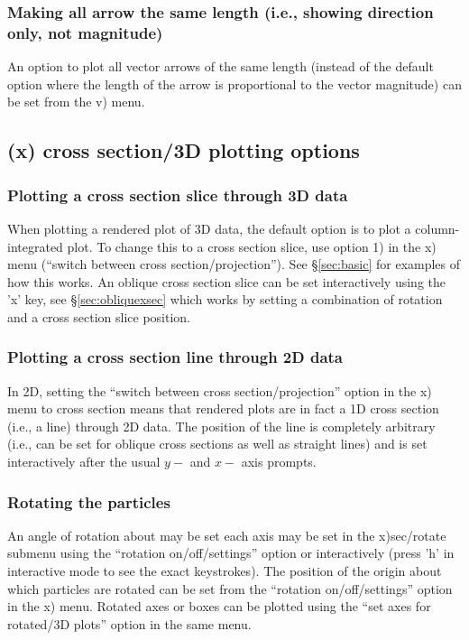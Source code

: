 \documentclass[a4paper,10pt]{article}
\begin{document}
\subsubsection{ Making all arrow the same length (i.e., showing direction only, not magnitude)}
 An option to plot all vector arrows of the same length (instead of the default option where the length of the arrow is proportional to the vector magnitude) can be set from the v) menu.

\subsection{(x) cross section/3D plotting options}%

\subsubsection{ Plotting a cross section slice through 3D data}
 When plotting a rendered plot of 3D data, the default option is to plot a column-integrated plot. To change this to a cross section slice, use option 1) in the x) menu (``switch between cross section/projection''). See \S\ref{sec:basic} for examples of how this works. An oblique cross section slice can be set interactively using the 'x' key, see \S\ref{sec:obliquexsec} which works by setting a combination of rotation and a cross section slice position. 

\subsubsection{ Plotting a cross section line through 2D data}
 In 2D, setting the ``switch between cross section/projection'' option in the x) menu to cross section means that rendered plots are in fact a 1D cross section (i.e., a line) through 2D data. The position of the line is completely arbitrary (i.e., can be set for oblique cross sections as well as straight lines) and is set interactively after the usual $y-$ and $x-$ axis prompts.

\subsubsection{ Rotating the particles}
 An angle of rotation about may be set each axis may be set in the x)sec/rotate submenu using the ``rotation on/off/settings'' option or
interactively (press 'h' in interactive mode to see the exact keystrokes). The position of the origin about which particles are rotated can be set from the ``rotation on/off/settings'' option in the x) menu.
Rotated axes or boxes can be plotted using the ``set axes for rotated/3D plots'' option in the same menu.
\end{document}

